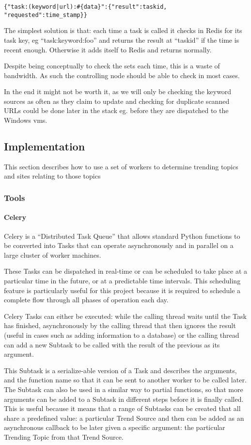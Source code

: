 \verb/{"task:(keyword|url):#{data}":{"result":taskid, "requested":time_stamp}}/

The simplest solution is that: each time a task is called it checks in Redis for its task key, eg ``task:keyword:foo'' and returns the result at ``taskid'' if the time is recent enough. Otherwise it adds itself to Redis and returns normally.

Despite being conceptually to check the sets each time, this is a waste of bandwidth. As such the controlling node should be able to check in most cases.

In the end it might not be worth it, as we will only be checking the keyword sources as often as they claim to update and checking for duplicate scanned URLs could be done later in the stack eg. before they are dispatched to the Windows vms.

\subsection{Implementation}
This section describes how to use a set of workers to determine trending topics and sites relating to those topics
\subsubsection{Tools}
\paragraph{Celery}
Celery is a ``Distributed Task Queue'' that allows standard Python functions to be converted into Tasks that can operate asynchronously and in parallel on a large cluster of worker machines.

These Tasks can be dispatched in real-time or can be scheduled to take place at a particular time in the future, or at a predictable time intervals.  This scheduling feature is particularly useful for this project because it is required to schedule a complete flow through all phases of operation each day.

Celery Tasks can either be executed: while the calling thread waits until the Task has finished,  asynchronously by the calling thread that then ignores the result (useful in cases such as adding information to a database) or the calling thread can add a new Subtask to be called with the result of the previous as its argument.

This Subtask is a serialize-able version of a Task and describes the arguments, and the function name so that it can be sent to another worker to be called later.  The Subtask can also be used in a similar way to partial functions, so that more arguments can be added to a Subtask in different steps before it is finally called.  This is useful because it means that a range of Subtasks can be created that all share a predefined value: a particular Trend Source and then can be added as an asynchronous callback to be later given a specific argument: the particular Trending Topic from that Trend Source.

